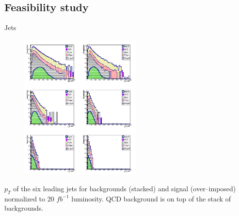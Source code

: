 \subsection{Feasibility study}

\begin{frame}{Jets \pt}
\vspace{-.4cm}
\begin{figure}[!Hhtbp]
  \begin{center}
    \includegraphics[width=0.55\textwidth]{../figs/Pheno/JetPt.png}
  \end{center}
\end{figure}
\vspace{-.4cm}
    \begin{block}{}
      \tiny \centering $p_{T}$  of the six leading jets for backgrounds (stacked) and signal (over--imposed) normalized to 20 $fb^{-1}$ luminosity. QCD background is on top of the stack of backgrounds.
    \end{block}

\end{frame}

